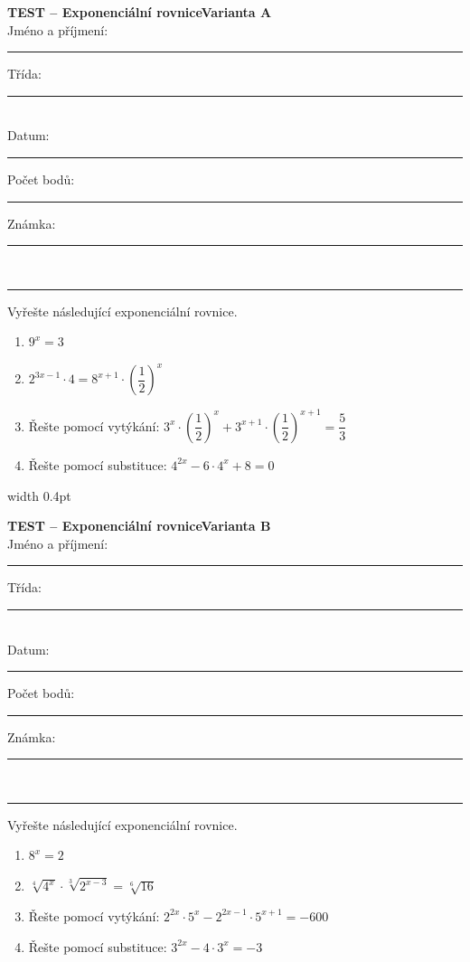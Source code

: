 \documentclass[a4paper,10pt,landscape]{article}
\newcommand{\TestTitle}{Exponenciální rovnice}
\newcommand{\TestHeader}[1]{%
    {\bfseries TEST -- \TestTitle}\hfill{\bfseries Varianta #1}\\[2mm]
    Jméno a příjmení: \rule{4.5cm}{0.4pt}\hfill Třída: \rule{1.5cm}{0.4pt}\\[2mm]
    Datum: \rule{2.4cm}{0.4pt}\hfill Počet bodů: \rule{1.4cm}{0.4pt}\hfill Známka: \rule{1.4cm}{0.4pt}\\[1mm]
    \hrule\vspace{3mm}
}
\newcommand{\AnswerSpace}[1]{\vspace{#1}}
\begin{document}
\noindent
\begin{minipage}[t]{0.48\textwidth}
    \small
    \TestHeader{A}

    Vyřešte následující exponenciální rovnice.
    \begin{enumerate}
        \item $9^x = 3$
        \AnswerSpace{18mm}
        \item $2^{3x-1} \cdot 4 = 8^{x+1} \cdot \left(\dfrac{1}{2}\right)^{x}$
        \AnswerSpace{24mm}
        \item Řešte pomocí vytýkání: $3^{x} \cdot \left(\dfrac{1}{2}\right)^{x} + 3^{x+1} \cdot \left(\dfrac{1}{2}\right)^{x+1} = \dfrac{5}{3}$
        \AnswerSpace{30mm}
        \item Řešte pomocí substituce: $4^{2x} - 6 \cdot 4^{x} + 8 = 0$
        \AnswerSpace{34mm}
    \end{enumerate}
\end{minipage}%
\hfill\vrule width 0.4pt\hfill
\begin{minipage}[t]{0.48\textwidth}
    \small
    \TestHeader{B}

    Vyřešte následující exponenciální rovnice.
    \begin{enumerate}
        \item $8^{x} = 2$
        \AnswerSpace{18mm}
        \item $\sqrt[4]{4^x} \cdot \sqrt[3]{2^{x-3}} = \sqrt[6]{16}$
        \AnswerSpace{24mm}
        \item Řešte pomocí vytýkání: $2^{2x} \cdot 5^{x} - 2^{2x-1} \cdot 5^{x+1} = -600$
        \AnswerSpace{30mm}
        \item Řešte pomocí substituce: $3^{2x} - 4 \cdot 3^{x} = -3$
        \AnswerSpace{34mm}
    \end{enumerate}
\end{minipage}
\end{document}
